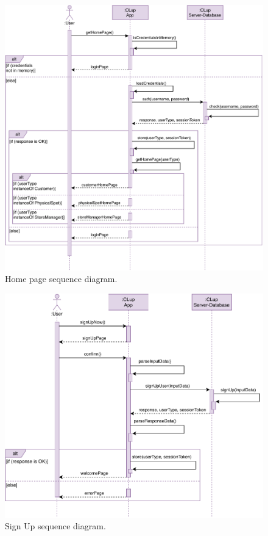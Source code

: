\begin{figure}[H]
    \centering
    \includegraphics[width=1.0\textwidth]{images/getHomePage_sequence_diagram.pdf}
    \caption{Home page sequence diagram.}
\end{figure}

\begin{figure}[H]
    \centering
    \includegraphics[width=1.0\textwidth]{images/signUp_sequence_diagram.pdf}
    \caption{Sign Up sequence diagram.}
\end{figure}

